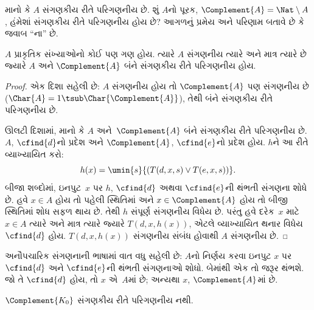 \begingroup
\makeatletter{}\makeatother

\label{guunit:OLP-0242}


માનો કે $A$ સંગણકીય રીતે પરિગણનીય છે. શું $A$નો પૂરક,
$\Complement{A} = \Nat \setminus A$, હંમેશાં સંગણકીય રીતે
પરિગણનીય હોય છે? આગળનું પ્રમેય અને પરિણામ બતાવે છે કે
જવાબ ``ના'' છે.

\begin{thm}
$A$ પ્રાકૃતિક સંખ્યાઓનો કોઈ પણ ગણ હોય. ત્યારે $A$ સંગણનીય
ત્યારે અને માત્ર ત્યારે છે જ્યારે $A$ અને $\Complement{A}$
બંને સંગણકીય રીતે પરિગણનીય હોય.
\end{thm}

\begin{proof}
એક દિશા સહેલી છે: $A$ સંગણનીય હોય તો $\Complement{A}$ પણ
સંગણનીય છે ($\Char{A} = 1 \tsub
\Char{\Complement{A}}$), તેથી બંને સંગણકીય રીતે પરિગણનીય છે.

ઊલટી દિશામાં, માનો કે $A$ અને~$\Complement{A}$ બંને
સંગણકીય રીતે પરિગણનીય છે. $A$, $\cfind{d}$નો પ્રદેશ
અને $\Complement{A}$, $\cfind{e}$નો પ્રદેશ હોય. $h$ને
આ રીતે વ્યાખ્યાયિત કરો:
\[
h(x) = \umin{s}{(T(d,x,s) \lor T(e,x,s))}.
\]
બીજા શબ્દોમાં, ઇનપુટ~$x$ પર $h$, $\cfind{d}$ અથવા
$\cfind{e}$ની થંભતી સંગણના શોધે છે. હવે $x \in A$ હોય
તો પહેલી સ્થિતિમાં અને $x \in \Complement{A}$ હોય તો
બીજી સ્થિતિમાં શોધ સફળ થાય છે. તેથી $h$ સંપૂર્ણ સંગણનીય
વિધેય છે. પરંતુ હવે દરેક~$x$ માટે $x \in A$ ત્યારે અને
માત્ર ત્યારે જ્યારે $T(d, x, h(x))$, એટલે વ્યાખ્યાયિત
થનાર વિધેય $\cfind{d}$ હોય. $T(d, x, h(x))$ સંગણનીય
સંબંધ હોવાથી $A$ સંગણનીય છે.
\end{proof}

\begin{explain}
અનૌપચારિક સંગણનાની ભાષામાં વાત વધુ સહેલી છે: $A$નો નિર્ણય
કરવા ઇનપુટ $x$ પર $\cfind{d}$ અને $\cfind{e}$ની થંભતી
સંગણનાઓ શોધો. બેમાંથી એક તો જરૂર થંભશે. જો તે
$\cfind{d}$ હોય, તો $x$ એ~$A$માં છે; અન્યથા
$x$, $\Complement{A}$માં છે.
\end{explain}

\begin{cor}
$\Complement{K_0}$ સંગણકીય રીતે પરિગણનીય નથી.
\end{cor}

